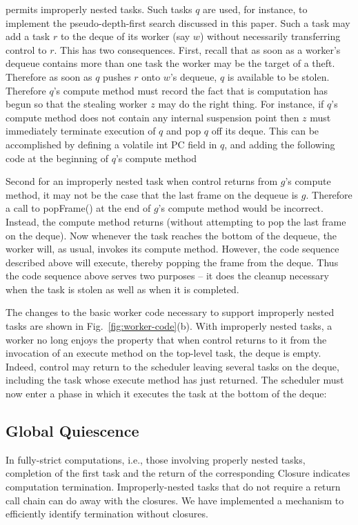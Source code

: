 \Xten{} permits improperly nested tasks. Such tasks $q$ are used, for
instance, to implement the pseudo-depth-first search discussed in this
paper. Such a task may add a task $r$ to the deque of its worker (say $w$)
without necessarily transferring control to $r$. This has two
consequences. First, recall that as soon as a worker's dequeue
contains more than one task the worker may be the target of a
theft. Therefore as soon as $q$ pushes $r$ onto $w$'s dequeue, $q$ is
available to be stolen.  Therefore $q$'s compute method must record the
fact that is computation has begun so that the stealing worker $z$ may
do the right thing. For instance, if $q$'s compute method does not
contain any internal suspension point then $z$ must immediately
terminate execution of $q$ and pop $q$ off its deque. This can be
accomplished by defining a volatile int PC field in $q$, and adding the
following code at the beginning of $q$'s compute method

Second for an improperly nested task when control returns from $g$'s
compute method, it may not be the case that the last frame on the
dequeue is $g$. Therefore a call to {\java popFrame()} at the end of
$g$'s compute method would be incorrect. Instead, the compute method
returns (without attempting to pop the last frame on the deque). Now
whenever the task reaches the bottom of the dequeue, the worker will,
as usual, invokes its compute method. However, the code sequence
described above will execute, thereby popping the frame from the
deque. Thus the code sequence above serves two purposes -- it does the
cleanup necessary when the task is stolen as well as when it is
completed.

The changes to the basic worker code necessary to support improperly
nested tasks are shown in Fig.~\ref{fig:worker-code}(b). With
improperly nested tasks, a worker no long enjoys the property that
when control returns to it from the invocation of an execute method on
the top-level task, the deque is empty. Indeed, control may return to
the scheduler leaving several tasks on the deque, including the task
whose execute method has just returned. The scheduler must now enter a
phase in which it executes the task at the bottom of the deque:

\subsection{Global Quiescence}

In fully-strict computations, i.e., those involving properly nested
tasks, completion of the first task and the return of the
corresponding Closure indicates computation termination.
Improperly-nested tasks that do not require a return call chain can do
away with the closures. We have implemented a mechanism to efficiently
identify termination without closures.

